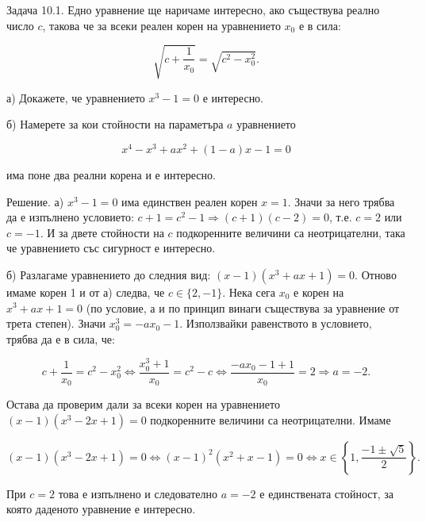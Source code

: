 
Задача 10.1. Едно уравнение ще наричаме интересно, ако съществува реално число $c$, такова че за всеки реален корен на уравнението $x_0$ е в сила:

$$\sqrt{c+\frac{1}{x_0}}=\sqrt{c^2-x_0^2}.$$

а) Докажете, че уравнението $x^3-1=0$ е интересно.

б) Намерете за кои стойности на параметъра $a$ уравнението

$$x^4-x^3+ax^2+(1-a)x-1=0$$

има поне два реални корена и е интересно.

Решение. а) $x^3-1=0$ има единствен реален корен $x=1$. Значи за него трябва да е изпълнено условието: $c+1=c^2-1\Longrightarrow(c+1)(c-2)=0$, т.е. $c=2$ или $c=-1$. И за двете стойности на $c$ подкоренните величини са неотрицателни, така че уравнението със сигурност е интересно.

б) Разлагаме уравнението до следния вид: $(x-1)(x^3+ax+1)=0$. Отново имаме корен 1 и от а) следва, че $c\in\{2,-1\}$. Нека сега $x_0$ е корен на $x^3+ax+1=0$ (по условие, а и по принцип винаги съществува за уравнение от трета степен). Значи $x_0^3=-ax_0-1$. Използвайки равенството в условието, трябва да е в сила, че:

$$c+\frac{1}{x_0}=c^2-x_0^2\Longleftrightarrow\frac{x_0^3+1}{x_0}=c^2-c\Longleftrightarrow\frac{-ax_0-1+1}{x_0}=2\Longrightarrow a=-2.$$

Остава да проверим дали за всеки корен на уравнението $(x-1)(x^3-2x+1)=0$ подкоренните величини са неотрицателни. Имаме

$$(x-1)(x^3-2x+1)=0\Longleftrightarrow(x-1)^2(x^2+x-1)=0\Longleftrightarrow x\in\left\{1,\frac{-1\pm\sqrt5}{2}\right\}.$$

При $c=2$ това е изпълнено и следователно $a=-2$ е единствената стойност, за която даденото уравнение е интересно.

